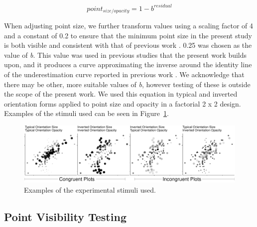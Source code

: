 \documentclass[manuscript, review, anonymous, screen]{acmart}
\begin{document}
\begin{equation}
  point_{size/opacity} = 1 - b^{residual}
\end{equation}

When adjusting point size, we further transform values using a scaling
factor of 4 and a constant of 0.2 to ensure that the minimum point size
in the present study is both visible and consistent with that of
previous work \citep{strain_2023, strain_2023b}. 0.25 was chosen as the
value of \emph{b}. This value was used in previous studies that the
present work builds upon, and it produces a curve approximating the
inverse around the identity line of the underestimation curve reported
in previous work \citep{rensink_2017, strain_2023, strain_2023b}. We
acknowledge that there may be other, more suitable values of \emph{b},
however testing of these is outside the scope of the present work. We
used this equation in typical and inverted orientation forms applied to
point size and opacity in a factorial 2 x 2 design. Examples of the
stimuli used can be seen in Figure~\ref{fig-examples}.

\begin{figure}

\includegraphics[width=1\textwidth,height=\textheight]{size_and_opacity_files/figure-pdf/fig-examples-1.pdf} \hfill{}

\caption{\label{fig-examples}Examples of the experimental stimuli used.}

\end{figure}

\hypertarget{sec-VT}{%
\subsection{Point Visibility Testing}\label{sec-VT}}
\end{document}
